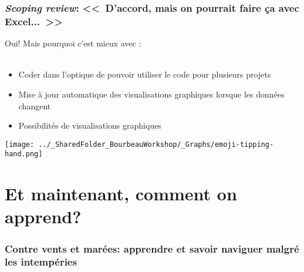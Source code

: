 \documentclass{beamer}
\begin{document}
    \begin{frame}
    
      \frametitle{\emph{Scoping review}: <<~D'accord, mais on pourrait faire ça avec Excel...~>>} \vspace{1.5cm}
      
    Oui! Mais pourquoi c'est mieux avec \R: \\~\\
    
        \begin{itemize}
          \item{Coder dans l'optique de pouvoir utiliser le code pour plusieurs projets}
          \item{Mise à jour automatique des visualisations graphiques lorsque les données changent}
          \item{Possibilités de visualisations graphiques}
        \end{itemize}
	
	  \begin{flushright}
     	    \texttt{[image: ../\_SharedFolder\_BourbeauWorkshop/\_Graphs/emoji-tipping-hand.png]}
    \end{flushright} 
          
    \end{frame}  
    

\section{Et maintenant, comment on apprend?}

    \begin{frame}
    
        \frametitle{Contre vents et marées: apprendre \R et savoir naviguer malgré les intempéries} \vspace{1cm}
    
    \end{frame}
    
\end{document}
